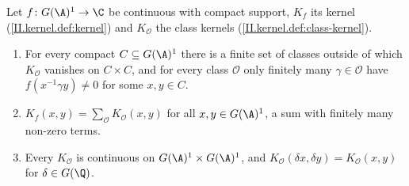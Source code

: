 Let $f\colon G(\A)^1\to\C$ be continuous with compact support, $K_f$ its kernel (\cref{II.kernel.def:kernel}) and $K_{\mathcal O}$ the class kernels
(\cref{II.kernel.def:class-kernel}).
\begin{enumerate}
  \item[(a)] For every compact $C\subseteq G(\A)^1$ there is a finite set of classes outside of which $K_{\mathcal O}$ vanishes on $C\times C$, and for every
  class $\mathcal O$ only finitely many $\gamma\in\mathcal O$ have $f(x^{-1}\gamma y)\neq0$ for some $x,y\in C$.
  \item[(b)] $K_f(x,y)=\sum_{\mathcal O}K_{\mathcal O}(x,y)$ for all $x,y\in G(\A)^1$, a sum with finitely many non-zero terms.
  \item[(c)] Every $K_{\mathcal O}$ is continuous on $G(\A)^1\times G(\A)^1$, and $K_{\mathcal O}(\delta x,\delta y)=K_{\mathcal O}(x,y)$ for $\delta\in G(\Q)$.
\end{enumerate}

